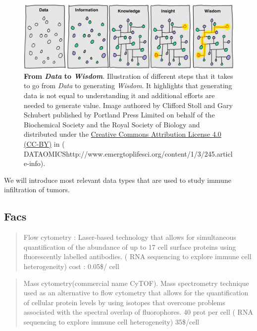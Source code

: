 \documentclass[12pt,]{book}
\theoremstyle{definition}
\theoremstyle{definition}
\theoremstyle{definition}
\theoremstyle{remark}
\begin{document}
\begin{figure}

{\centering \includegraphics[width=0.8\linewidth]{figures-ext/01-Information_power} 

}

\caption{\textbf{From \emph{Data} to
\emph{Wisdom}}. Illustration of different steps that it takes to go from
\emph{Data} to generating \emph{Wisdom}. It highlights that generating
data is not equal to understanding it and additional efforts are needed
to generate value. Image authored by Clifford Stoll and Gary Schubert
published by Portland Press Limited on behalf of the Biochemical Society
and the Royal Society of Biology and distributed under the
\href{https://creativecommons.org/licenses/by/4.0/}{Creative Commons
Attribution License 4.0 (CC-BY)} in (\citet{BIG}
DATAOMICShttp://www.emergtoplifesci.org/content/1/3/245.article-info).}\label{fig:information-power}
\end{figure}












We will introduce most relevant data types that are used to study immune
infiltration of tumors.

\hypertarget{facs}{%
\subsection{Facs}\label{facs}}

\begin{quote}
Flow cytometry : Laser-based technology that allows for simultaneous
quantification of the abundance of up to 17 cell surface proteins using
fluorescently labelled antibodies. (\citet{Single-cell} RNA sequencing
to explore immune cell heterogeneity) cost : 0.05\$/ cell
\end{quote}

\begin{quote}
Mass cytometry(commercial name CyTOF). Mass spectrometry technique used
as an alternative to flow cytometry that allows for the quantification
of cellular protein levels by using isotopes that overcome problems
associated with the spectral overlap of fluorophores. 40 prot per cell
(\citet{Single-cell} RNA sequencing to explore immune cell
heterogeneity) 35\$/cell
\end{quote}
\end{document}
